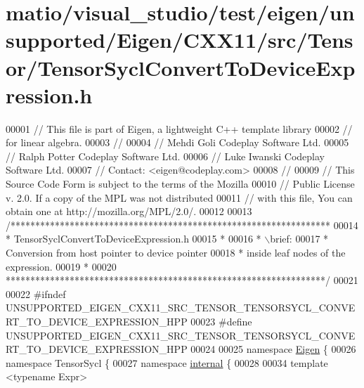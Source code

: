 \hypertarget{matio_2visual__studio_2test_2eigen_2unsupported_2_eigen_2_c_x_x11_2src_2_tensor_2_tensor_sycl_convert_to_device_expression_8h_source}{}\section{matio/visual\+\_\+studio/test/eigen/unsupported/\+Eigen/\+C\+X\+X11/src/\+Tensor/\+Tensor\+Sycl\+Convert\+To\+Device\+Expression.h}
\label{matio_2visual__studio_2test_2eigen_2unsupported_2_eigen_2_c_x_x11_2src_2_tensor_2_tensor_sycl_convert_to_device_expression_8h_source}

\begin{DoxyCode}
00001 \textcolor{comment}{// This file is part of Eigen, a lightweight C++ template library}
00002 \textcolor{comment}{// for linear algebra.}
00003 \textcolor{comment}{//}
00004 \textcolor{comment}{// Mehdi Goli    Codeplay Software Ltd.}
00005 \textcolor{comment}{// Ralph Potter  Codeplay Software Ltd.}
00006 \textcolor{comment}{// Luke Iwanski  Codeplay Software Ltd.}
00007 \textcolor{comment}{// Contact: <eigen@codeplay.com>}
00008 \textcolor{comment}{//}
00009 \textcolor{comment}{// This Source Code Form is subject to the terms of the Mozilla}
00010 \textcolor{comment}{// Public License v. 2.0. If a copy of the MPL was not distributed}
00011 \textcolor{comment}{// with this file, You can obtain one at http://mozilla.org/MPL/2.0/.}
00012 
00013 \textcolor{comment}{/*****************************************************************}
00014 \textcolor{comment}{ * TensorSyclConvertToDeviceExpression.h}
00015 \textcolor{comment}{ *}
00016 \textcolor{comment}{ * \(\backslash\)brief:}
00017 \textcolor{comment}{ *  Conversion from host pointer to device pointer}
00018 \textcolor{comment}{ *  inside leaf nodes of the expression.}
00019 \textcolor{comment}{ *}
00020 \textcolor{comment}{*****************************************************************/}
00021 
00022 \textcolor{preprocessor}{#ifndef UNSUPPORTED\_EIGEN\_CXX11\_SRC\_TENSOR\_TENSORSYCL\_CONVERT\_TO\_DEVICE\_EXPRESSION\_HPP}
00023 \textcolor{preprocessor}{#define UNSUPPORTED\_EIGEN\_CXX11\_SRC\_TENSOR\_TENSORSYCL\_CONVERT\_TO\_DEVICE\_EXPRESSION\_HPP}
00024 
00025 \textcolor{keyword}{namespace }\hyperlink{namespace_eigen}{Eigen} \{
00026 \textcolor{keyword}{namespace }TensorSycl \{
00027 \textcolor{keyword}{namespace }\hyperlink{namespaceinternal}{internal} \{
00028 
00034 \textcolor{keyword}{template} <\textcolor{keyword}{typename} Expr>

\end{DoxyCode}
